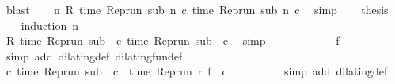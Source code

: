 \begin{isabellebody}
\ blast\isanewline
\ \ \isamarkupfalse%
\ {}{\isacharcolon}{\isacartoucheopen}{\isasymforall}n{\isachardot}\ R\ {\isacharparenleft}time\ {\isacharparenleft}{\isacharparenleft}Rep{\isacharunderscore}run\ sub{\isacharparenright}\ n\ c\ time\ {\isacharparenleft}{\isacharparenleft}Rep{\isacharunderscore}run\ sub{\isacharparenright}\ n\ c\ \isamarkupfalse%
\ simp\isanewline
\ \ \isamarkupfalse%
\ {\isacharquery}thesis\isanewline
\ \ \isamarkupfalse%
\ {\isacharparenleft}induction\ n{\isacharparenright}\isanewline
\ \ \ \ \isamarkupfalse%
\ {}\isanewline
\ \ \ \ \ \ \isamarkupfalse%
\ {}\ \isamarkupfalse%
\ {\isacartoucheopen}R\ {\isacharparenleft}time\ {\isacharparenleft}{\isacharparenleft}Rep{\isacharunderscore}run\ sub{\isacharparenright}\ {}\ c\ time\ {\isacharparenleft}{\isacharparenleft}Rep{\isacharunderscore}run\ sub{\isacharparenright}\ {}\ c\ \isamarkupfalse%
\ simp\isanewline
\ \ \ \ \ \ \isamarkupfalse%
\ \isamarkupfalse%
\ {\isacharasterisk}\ \isamarkupfalse%
\ {\isacartoucheopen}f\ {}\ {\isacharequal}\ {}{\isacartoucheclose}\ \isamarkupfalse%
\ {\isacharparenleft}simp\ add{\isacharcolon}\ dilating{\isacharunderscore}def\ dilating{\isacharunderscore}fun{\isacharunderscore}def{\isacharparenright}\isanewline
\ \ \ \ \ \ \isamarkupfalse%
\ \isamarkupfalse%
\ {\isacharasterisk}\ \isamarkupfalse%
\ {\isacartoucheopen}{\isasymforall}c{\isachardot}\ time\ {\isacharparenleft}{\isacharparenleft}Rep{\isacharunderscore}run\ sub{\isacharparenright}\ {}\ c{\isacharparenright}\ {\isacharequal}\ time\ {\isacharparenleft}{\isacharparenleft}Rep{\isacharunderscore}run\ r{\isacharparenright}\ {\isacharparenleft}f\ {}{\isacharparenright}\ c{\isacharparenright}{\isacartoucheclose}\isanewline
\ \ \ \ \ \ \ \ \isamarkupfalse%
\ {\isacharparenleft}simp\ add{\isacharcolon}\ dilating{\isacharunderscore}def{\isacharparenright}\isanewline
\ \ \ \ \ \ \isamarkupfalse%
\ \isamarkupfalse%

\end{isabellebody}
